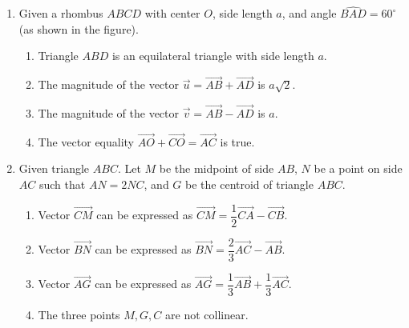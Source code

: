 \documentclass[10pt,a4paper]{article}
\begin{document}
\begin{enumerate}
\item Given a rhombus $ABCD$ with center $O$, side length $a$, and angle $\widehat{BAD} = 60^\circ$ (as shown in the figure).
\par\noindent\begin{minipage}[t]{0.72\linewidth}
\begin{enumerate}
    \item Triangle $ABD$ is an equilateral triangle with side length $a$.
    \item The magnitude of the vector $\vec{u} = \vec{AB} + \vec{AD}$ is $a\sqrt{2}$.
    \item The magnitude of the vector $\vec{v} = \vec{AB} - \vec{AD}$ is $a$.
    \item The vector equality $\vec{AO} + \vec{CO} = \vec{AC}$ is true.
\end{enumerate}
\end{minipage}\hfill
\begin{minipage}[t]{0.26\linewidth}\raggedleft\vspace{-6pt}
\end{minipage}

\item Given triangle $ABC$. Let $M$ be the midpoint of side $AB$, $N$ be a point on side $AC$ such that $AN = 2NC$, and $G$ be the centroid of triangle $ABC$.
\begin{enumerate}
    \item Vector $\vec{CM}$ can be expressed as $\vec{CM} = \dfrac{1}{2}\vec{CA} - \vec{CB}$.
    \item Vector $\vec{BN}$ can be expressed as $\vec{BN} = \dfrac{2}{3}\vec{AC} - \vec{AB}$.
    \item Vector $\vec{AG}$ can be expressed as $\vec{AG} = \dfrac{1}{3}\vec{AB} + \dfrac{1}{3}\vec{AC}$.
    \item The three points $M, G, C$ are not collinear.
\end{enumerate}


\end{enumerate}
\end{document}
